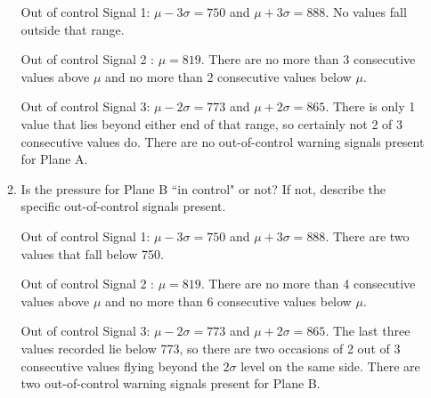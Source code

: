 \documentclass{article}
\newcommand{\answer}[1]{\color{white}#1}
\begin{document}
\begin{enumerate}
\begin{enumerate}
	{\answer Out of control Signal 1: $\mu -3\sigma = 750$ and $\mu +3\sigma = 888$.  No values fall outside that range. 
	
	Out of control Signal 2 : $\mu = 819$.  There are no more than 3 consecutive values above $\mu$ and no more than 2 consecutive values below $\mu$.
	
	Out of control Signal 3: $\mu -2\sigma = 773$ and $\mu +2\sigma = 865$.  There is only 1 value that lies beyond either end of that range, so certainly not 2 of 3 consecutive values do. There are no out-of-control warning signals present for Plane A.} 
	
	\item  Is the pressure for Plane B ``in control" or not?  If not, describe the specific out-of-control signals present.
	
	{\answer Out of control Signal 1: $\mu -3\sigma = 750$ and $\mu +3\sigma = 888$.  There are two values that fall below 750. 
	
	Out of control Signal 2 : $\mu = 819$.  There are no more than 4 consecutive values above $\mu$ and no more than 6 consecutive values below $\mu$. 
	
	Out of control Signal 3: $\mu -2\sigma = 773$ and $\mu +2\sigma = 865$.  The last three values recorded lie below 773, so there are two occasions of 2 out of 3 consecutive values flying beyond the $2\sigma$ level on the same side. There are two out-of-control warning signals present for Plane B.} 
	\end{enumerate}
	
	



\end{enumerate}
\end{document}
